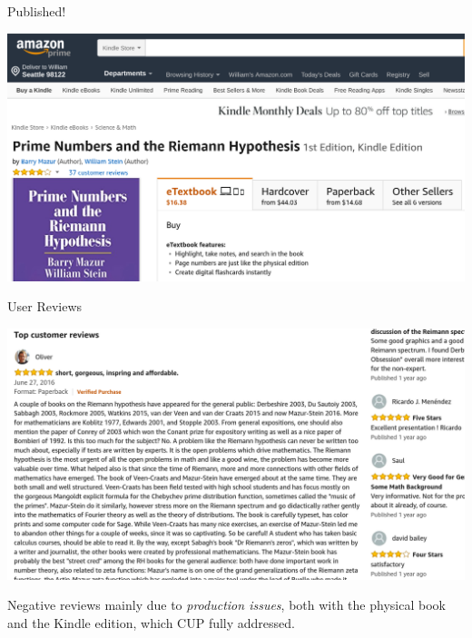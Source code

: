 \documentclass{beamer}
\begin{document}
\begin{frame}{Published!}

  \includegraphics[width=.98\textwidth]{pics/amazon-prime}

\end{frame}



\begin{frame}{User Reviews}

  \includegraphics[width=.95\textwidth]{pics/amazon-review}

  \hrulefill

  \vfill

  Negative reviews  mainly due to \textit{production issues},
  both with the physical book
  and the Kindle edition, which CUP fully addressed.

\end{frame}
\end{document}
